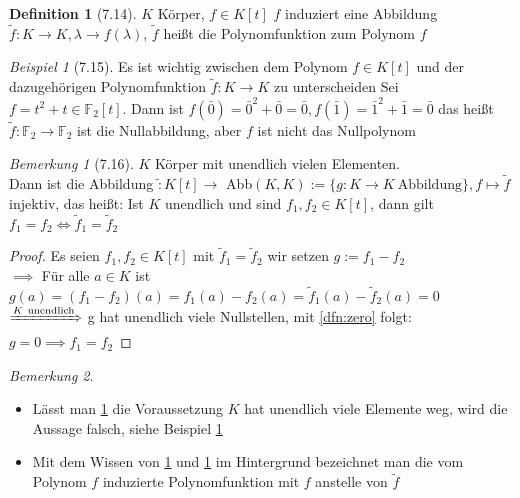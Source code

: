 \documentclass[a4paper]{scrartcl}
\theoremstyle{definition}
\newtheorem{defn}{Definition}
\theoremstyle{plain}
\theoremstyle{plain}
\theoremstyle{remark}
\newtheorem{remark}{Bemerkung}
\theoremstyle{remark}
\theoremstyle{remark}
\theoremstyle{remark}
\theoremstyle{remark}
\newtheorem{ex}{Beispiel}
\begin{document}
\begin{defn}[7.14]
$K$ Körper, $f\in K[t]$
$f$ induziert eine Abbildung $\tilde f: K\to K,\lambda\to f(\lambda)$, $\tilde f$ heißt die Polynomfunktion zum Polynom $f$
\end{defn}
\begin{ex}[7.15]
\label{ex:715}
Es ist wichtig zwischen dem Polynom $f\in K[t]$ und der dazugehörigen Polynomfunktion $\tilde f: K\to K$ zu unterscheiden
Sei $f = t^2 + t \in \mathbb{F}_2 [t]$. Dann ist $f(\bar 0) = \bar 0^2 + \bar 0 = \bar 0, f(\bar 1) = \bar 1^2 + \bar 1 = \bar 0$
das heißt $\tilde f: \mathbb{F}_2 \to \mathbb{F}_2$ ist die Nullabbildung, aber $f$ ist nicht das Nullpolynom
\end{ex}
\begin{remark}[7.16]
\label{remark:716}
$K$ Körper mit unendlich vielen Elementen. \\
  Dann ist die Abbildung $\tilde : K[t]\to$ Abb$(K,K):=\{g:K\to K ~\text{Abbildung}\}, f\mapsto \tilde f$ injektiv, das heißt:
Ist $K$ unendlich und sind $f_1,f_2 \in K[t]$, dann gilt $f_1 = f_2 \iff \tilde f_1 = \tilde f_2$
\end{remark}
\begin{proof}
Es seien $f_1,f_2 \in K[t]$ mit $\tilde f_1 = \tilde f_2$ wir setzen $g:= f_1 - f_2$ \\
  $\implies$ Für alle $a\in K$ ist $g(a) = (f_1 - f_2)(a) = f_1(a) - f_2(a) = \tilde f_1(a) - \tilde f_2(a) = 0$
$\xRightarrow{K~\text{unendlich}}$ g hat unendlich viele Nullstellen, mit \ref{dfn:zero} folgt: $g = 0\implies f_1 = f_2$
\end{proof}
\begin{remark}
\begin{itemize}
\item Lässt man \ref{remark:716} die Voraussetzung $K$ hat unendlich viele Elemente weg, wird die Aussage falsch, siehe Beispiel \ref{ex:715}
\item Mit dem Wissen von \ref{ex:715} und \ref{remark:716} im Hintergrund bezeichnet man die vom Polynom $f$ induzierte Polynomfunktion mit $f$ anstelle von $\tilde f$
\end{itemize}
\end{remark}
\end{document}
